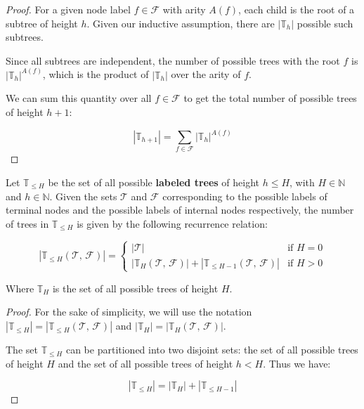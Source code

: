 \begin{proof}
    For a given node label \(f \in \mathcal{F}\) with arity \(A(f)\), each child
    is the root of a subtree of height \(h\).
    Given our inductive assumption, there are \(|\mathbb{T}_{h}|\) possible
    such subtrees.

    Since all subtrees are independent, the number of possible trees with the
    root \(f\) is \(|\mathbb{T}_{h}|^{A(f)}\), which is the product of 
    \(|\mathbb{T}_{h}|\) over the arity of \(f\).

    We can sum this quantity over all \(f \in \mathcal{F}\) to get the total
    number of possible trees of height \(h + 1\):

    \[
      |\mathbb{T}_{h + 1}| = \sum_{f \in \mathcal{F}} |\mathbb{T}_{h}|^{A(f)}
    \]
  \end{proof}

  \begin{lemma}
  \label{lemma:bg:gp:repr_ev:leq_h_height_trees}
    Let \(\mathbb{T}_{\leq H}\) be the set of all possible \textbf{labeled 
    trees} of height \(h \leq H\), with \(H \in \mathbb{N}\) and \(h \in 
    \mathbb{N}\).
    Given the sets \(\mathcal{T}\) and \(\mathcal{F}\) corresponding to the
    possible labels of terminal nodes and the possible labels of internal nodes
    respectively, the number of trees in \(\mathbb{T}_{\leq H}\) is given by the
    following recurrence relation:

    \begin{equation}
      \label{eq:bg:gp:repr_ev:leq_h_height_trees}
      |\mathbb{T}_{\leq H}(\mathcal{T},\, \mathcal{F})| = \begin{cases}
        |\mathcal{T}| 
          & \text{if } H = 0 \\
        |\mathbb{T}_{H}(\mathcal{T},\, \mathcal{F})| 
            + |\mathbb{T}_{\leq H - 1}(\mathcal{T},\, \mathcal{F})|
          & \text{if } H > 0
      \end{cases}
    \end{equation}

    Where \(\mathbb{T}_{H}\) is the set of all possible trees of height \(H\).
  \end{lemma}

  \begin{proof}
    For the sake of simplicity, we will use the notation
    \(|\mathbb{T}_{\leq H}| = |\mathbb{T}_{\leq H}(\mathcal{T},\, \mathcal{F})|\)
    and \(|\mathbb{T}_{H}| = |\mathbb{T}_{H}(\mathcal{T},\, \mathcal{F})|\).

    The set \(\mathbb{T}_{\leq H}\) can be partitioned into two disjoint sets: 
    the set of all possible trees of height \(H\) and the set of all possible
    trees of height \(h < H\).
    Thus we have:
    
    \[
      |\mathbb{T}_{\leq H}| = |\mathbb{T}_{H}| + |\mathbb{T}_{\leq H - 1}|
    \]
  \end{proof}

